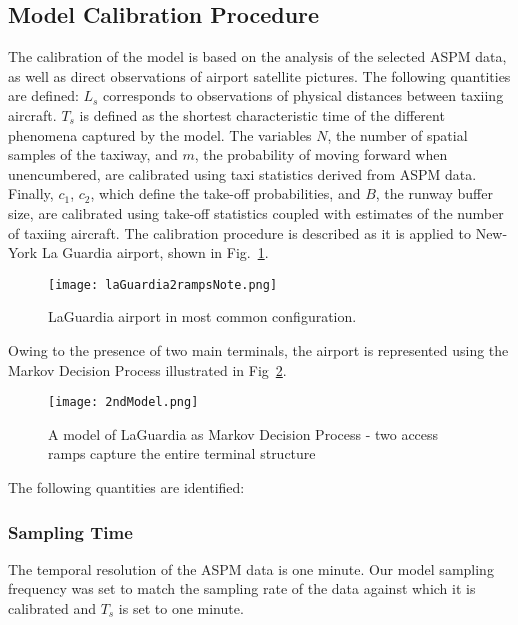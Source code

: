 \documentclass[letterpaper]{article}
\begin{document}
\subsection{Model Calibration Procedure} \label{s:calibration}
The calibration of the model is based on the analysis of the selected ASPM data, as well as 
direct observations of airport satellite pictures. The following quantities are defined: $L_s$ corresponds to observations 
of physical distances between taxiing aircraft. $T_s$ is defined as the shortest characteristic time of the different phenomena
 captured by the model. The variables $N$, the number of spatial samples of the taxiway, and $m$, the probability of moving forward 
 when unencumbered, are calibrated using taxi statistics derived from ASPM data. 
 Finally, $c_1$, $c_2$, which define the take-off probabilities, and $B$, the runway buffer size, are calibrated using take-off 
 statistics coupled with estimates of the number of taxiing aircraft. The calibration procedure is described as it is applied to New-York La Guardia airport, shown in Fig.~\ref{f:LGQuickAccess}.
\begin{figure}[ht]
\centering
\texttt{[image: laGuardia2rampsNote.png]}
\caption{LaGuardia airport in most common configuration.}
\label{f:LGQuickAccess}
\end{figure} 
Owing to the presence of two main terminals, the airport is represented using the Markov Decision Process illustrated in Fig~\ref{f:2ndModel}.
\begin{figure}[ht]
\centering
\texttt{[image: 2ndModel.png]}
\caption{A model of LaGuardia as Markov Decision Process - two access ramps capture the entire terminal structure}
\label{f:2ndModel}
\end{figure}
The following quantities are identified:
\subsubsection{Sampling Time}
 The temporal resolution of the ASPM data is one minute. Our model sampling frequency was set to match the sampling rate 
 of the data against which it is calibrated and $T_s$ is set to one minute.
\end{document}
